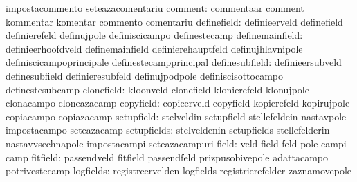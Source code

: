                                   impostacommento                  seteazacomentariu
                         comment: commentaar                       comment
                                  kommentar                        komentar
                                  commento                         comentariu
                     definefield: definieerveld                    definefield
                                  definierefeld                    definujpole
                                  definiscicampo                   definestecamp
                 definemainfield: definieerhoofdveld               definemainfield
                                  definierehauptfeld               definujhlavnipole
                                  definiscicampoprincipale         definestecampprincipal
                  definesubfield: definieersubveld                 definesubfield
                                  definieresubfeld                 definujpodpole
                                  definiscisottocampo              definestesubcamp
                      clonefield: kloonveld                        clonefield
                                  klonierefeld                     klonujpole
                                  clonacampo                       cloneazacamp
                       copyfield: copieerveld                      copyfield
                                  kopierefeld                      kopirujpole
                                  copiacampo                       copiazacamp
                      setupfield: stelveldin                       setupfield
                                  stellefeldein                    nastavpole
                                  impostacampo                     seteazacamp
                     setupfields: stelveldenin                     setupfields
                                  stellefelderin                   nastavvsechnapole
                                  impostacampi                     seteazacampuri
                           field: veld                             field
                                  feld                             pole
                                  campi                            camp
                        fitfield: passendveld                      fitfield
                                  passendfeld                      prizpusobivepole %
                                  adattacampo                      potrivestecamp
                       logfields: registreervelden                 logfields
                                  registrierefelder                zaznamovepole
